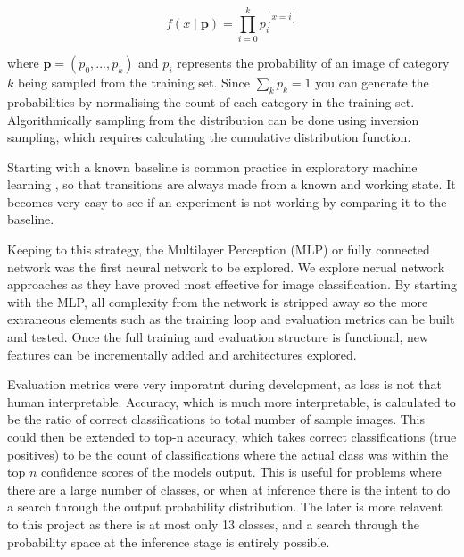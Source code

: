 $$ f(x \;|\; \bm{p}) = \prod\limits_{i=0}^{k}{p_i^{[x=i]}} $$

where $\bm{p} = (p_0, ..., p_k)$ and $p_i$ represents the probability of an image of category $k$ being sampled from the training set.
Since $\sum_{k}{p_k} = 1$ you can generate the probabilities by normalising the count of each category in the training set.  Algorithmically 
sampling from the distribution can be done using inversion sampling, which requires calculating the cumulative distribution function.

Starting with a known baseline is common practice in exploratory machine learning \cite{mukhoti2018importance}, so that transitions are always made from a known and working state.  
It becomes very easy to see if an experiment is not working by comparing it to the baseline.

Keeping to this strategy, the Multilayer Perception (MLP) or fully connected network \cite{murtagh1991multilayer} was the first neural network to be explored.
We explore nerual network approaches as they have proved most effective for image classification. 
By starting with the MLP, all complexity from the network is stripped away so the more extraneous elements such as the training loop and 
evaluation metrics can be built and tested.
Once the full training and evaluation structure is functional, new features can be incrementally added and architectures explored.

Evaluation metrics were very imporatnt during development, as loss is not that human interpretable.  Accuracy, which is much more interpretable, 
is calculated to be the ratio of correct classifications to total number of sample images.  This could then be extended to top-n accuracy, which 
takes correct classifications (true positives) to be the count of classifications where the actual class was within the top $n$ confidence scores 
of the models output.  This is useful for problems where there are a large number of classes, or when at inference there is the intent to do a search
through the output probability distribution.  The later is more relavent to this project as there is at most only 13 classes, and a search through the probability 
space at the inference stage is entirely possible.

